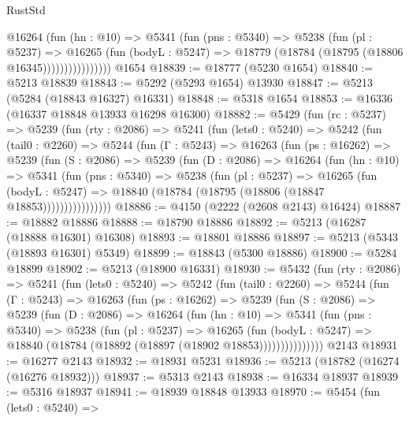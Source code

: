 \begin{lexlean}{RustStd}
\begin{coremodule}
                    @16264
                      (fun (hn : @10) =>
                      @5341
                        (fun (pns : @5340) =>
                        @5238
                          (fun (pl : @5237) =>
                          @16265
                            (fun (bodyL : @5247) =>
                            @18779 (@18784 (@18795 (@18806 @16345))))))))))))))))
    @1654
@18839 := @18777 (@5230 @1654)
@18840 := @5213 @18839
@18843 := @5292 (@5293 @1654) @13930
@18847 := @5213 (@5284 (@18843 @16327) @16331)
@18848 := @5318 @1654
@18853 := @16336 (@16337 @18848 @13933 @16298 @16300)
@18882 := @5429
    (fun (rc : @5237) =>
    @5239
      (fun (rty : @2086) =>
      @5241
        (fun (lets0 : @5240) =>
        @5242
          (fun (tail0 : @2260) =>
          @5244
            (fun (Γ : @5243) =>
            @16263
              (fun (ps : @16262) =>
              @5239
                (fun (S : @2086) =>
                @5239
                  (fun (D : @2086) =>
                  @16264
                    (fun (hn : @10) =>
                    @5341
                      (fun (pns : @5340) =>
                      @5238
                        (fun (pl : @5237) =>
                        @16265
                          (fun (bodyL : @5247) =>
                          @18840 (@18784 (@18795 (@18806 (@18847 @18853))))))))))))))))
@18886 := @4150 (@2222 (@2608 @2143) @16424)
@18887 := @18882 @18886
@18888 := @18790 @18886
@18892 := @5213 (@16287 (@18888 @16301) @16308)
@18893 := @18801 @18886
@18897 := @5213 (@5343 (@18893 @16301) @5349)
@18899 := @18843 (@5300 @18886)
@18900 := @5284 @18899
@18902 := @5213 (@18900 @16331)
@18930 := @5432
    (fun (rty : @2086) =>
    @5241
      (fun (lets0 : @5240) =>
      @5242
        (fun (tail0 : @2260) =>
        @5244
          (fun (Γ : @5243) =>
          @16263
            (fun (ps : @16262) =>
            @5239
              (fun (S : @2086) =>
              @5239
                (fun (D : @2086) =>
                @16264
                  (fun (hn : @10) =>
                  @5341
                    (fun (pns : @5340) =>
                    @5238
                      (fun (pl : @5237) =>
                      @16265
                        (fun (bodyL : @5247) =>
                        @18840 (@18784 (@18892 (@18897 (@18902 @18853)))))))))))))))
    @2143
@18931 := @16277 @2143
@18932 := @18931 @5231
@18936 := @5213 (@18782 (@16274 (@16276 @18932)))
@18937 := @5313 @2143
@18938 := @16334 @18937
@18939 := @5316 @18937
@18941 := @18939 @18848 @13933
@18970 := @5454
    (fun (lets0 : @5240) =>

\end{coremodule}
\end{lexlean}
